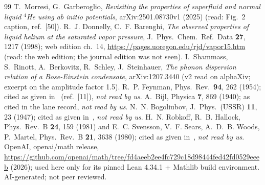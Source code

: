 \documentclass[11pt]{article}
\theoremstyle{remark}
\begin{document}
\begin{thebibliography}{99}
 T.~Morresi, G.~Garberoglio, \emph{Revisiting the properties of superfluid and normal liquid $^4$He using ab initio potentials}, arXiv:2501.08730v1 (2025) (read: Fig.~2 caption, ref.~[50]).
 R.~J. Donnelly, C.~F. Barenghi, \emph{The observed properties of liquid helium at the saturated vapor pressure}, J.\ Phys.\ Chem.\ Ref.\ Data \textbf{27}, 1217 (1998); web edition ch.~14, \url{https://pages.uoregon.edu/rjd/vapor15.htm} (read: the web edition; the journal edition was not seen).
 I.~Shammass, S.~Rinott, A.~Berkovitz, R.~Schley, J.~Steinhauer, \emph{The phonon dispersion relation of a Bose-Einstein condensate}, arXiv:1207.3440 (v2 read on alphaXiv; excerpt on the amplitude factor 1.5).
 R.~P. Feynman, Phys.\ Rev.\ \textbf{94}, 262 (1954); cited as given in~\cite{st} (ref.~[11]), \emph{not read by us}.
 A.~Bijl, Physica \textbf{7}, 869 (1940); as cited in the lane record, \emph{not read by us}.
 N.~N. Bogoliubov, J.\ Phys.\ (USSR) \textbf{11}, 23 (1947); cited as given in~\cite{sk,st}, \emph{not read by us}.
 H.~N. Robkoff, R.~B. Hallock, Phys.\ Rev.\ B \textbf{24}, 159 (1981) and E.~C. Svensson, V.~F. Sears, A.~D.~B. Woods, P.~Martel, Phys.\ Rev.\ B \textbf{21}, 3638 (1980); cited as given in~\cite{db,mg}, \emph{not read by us}.
 OpenAI, openai/math release, \url{https://github.com/openai/math/tree/fd4aeeb2ee4fc729c18d98444fed42fd0529eeeb} (2026); used here only for its pinned Lean 4.34.1 + Mathlib build environment. AI-generated; not peer reviewed.
\end{thebibliography}
\end{document}
